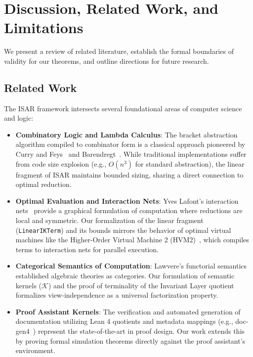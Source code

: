\chapter{Discussion, Related Work, and Limitations}

We present a review of related literature, establish the formal boundaries of validity for our theorems, and outline directions for future research.

\section{Related Work}

The ISAR framework intersects several foundational areas of computer science and logic:

\begin{itemize}
    \item \textbf{Combinatory Logic and Lambda Calculus}: The bracket abstraction algorithm compiled to combinator form is a classical approach pioneered by Curry and Feys~\cite{curry1958combinatory} and Barendregt~\cite{barendregt1984lambda}. While traditional implementations suffer from code size explosion (e.g., $O(n^3)$ for standard abstraction), the linear fragment of ISAR maintains bounded sizing, sharing a direct connection to optimal reduction.
    \item \textbf{Optimal Evaluation and Interaction Nets}: Yves Lafont's interaction nets~\cite{lafont1990interaction} provide a graphical formulation of computation where reductions are local and symmetric. Our formalization of the linear fragment (\texttt{LinearIKTerm}) and its bounds mirrors the behavior of optimal virtual machines like the Higher-Order Virtual Machine 2 (HVM2)~\cite{hvm2}, which compiles terms to interaction nets for parallel execution.
    \item \textbf{Categorical Semantics of Computation}: Lawvere's functorial semantics~\cite{lawvere1963functorial} established algebraic theories as categories. Our formulation of semantic kernels ($\mathcal{K}$) and the proof of terminality of the Invariant Layer quotient formalizes view-independence as a universal factorization property.
    \item \textbf{Proof Assistant Kernels}: The verification and automated generation of documentation utilizing Lean 4 quotients and metadata mappings (e.g., doc-gen4~\cite{docgen4}) represent the state-of-the-art in proof design. Our work extends this by proving formal simulation theorems directly against the proof assistant's environment.
\end{itemize}

